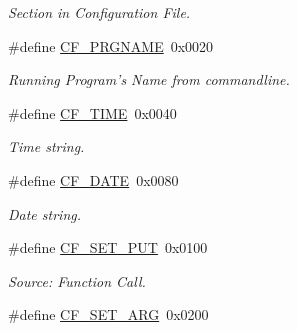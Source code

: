 \begin{DoxyCompactItemize}
\begin{DoxyCompactList}\small\item\em Section in Configuration File. \end{DoxyCompactList}\item 
\hypertarget{group__special__options__mask_ga071c29b5177f2df2400712ce8daae9b0}{\#define \hyperlink{group__special__options__mask_ga071c29b5177f2df2400712ce8daae9b0}{C\-F\-\_\-\-P\-R\-G\-N\-A\-M\-E}~0x0020}\label{group__special__options__mask_ga071c29b5177f2df2400712ce8daae9b0}

\begin{DoxyCompactList}\small\item\em Running Program's Name from commandline. \end{DoxyCompactList}\item 
\hypertarget{group__special__options__mask_ga0fde537a92deb77f75b21c9e8d306509}{\#define \hyperlink{group__special__options__mask_ga0fde537a92deb77f75b21c9e8d306509}{C\-F\-\_\-\-T\-I\-M\-E}~0x0040}\label{group__special__options__mask_ga0fde537a92deb77f75b21c9e8d306509}

\begin{DoxyCompactList}\small\item\em Time string. \end{DoxyCompactList}\item 
\hypertarget{group__special__options__mask_ga1c5b511a34d2c0db6631539ba81a4386}{\#define \hyperlink{group__special__options__mask_ga1c5b511a34d2c0db6631539ba81a4386}{C\-F\-\_\-\-D\-A\-T\-E}~0x0080}\label{group__special__options__mask_ga1c5b511a34d2c0db6631539ba81a4386}

\begin{DoxyCompactList}\small\item\em Date string. \end{DoxyCompactList}\item 
\hypertarget{group__special__options__mask_ga8d6cd1608fef5638efe964da63edf2dd}{\#define \hyperlink{group__special__options__mask_ga8d6cd1608fef5638efe964da63edf2dd}{C\-F\-\_\-\-S\-E\-T\-\_\-\-P\-U\-T}~0x0100}\label{group__special__options__mask_ga8d6cd1608fef5638efe964da63edf2dd}

\begin{DoxyCompactList}\small\item\em Source\-: Function Call. \end{DoxyCompactList}\item 
\hypertarget{group__special__options__mask_ga1b3eb474a5160e5a32385f6de53d90d6}{\#define \hyperlink{group__special__options__mask_ga1b3eb474a5160e5a32385f6de53d90d6}{C\-F\-\_\-\-S\-E\-T\-\_\-\-A\-R\-G}~0x0200}\label{group__special__options__mask_ga1b3eb474a5160e5a32385f6de53d90d6}


\end{DoxyCompactItemize}
